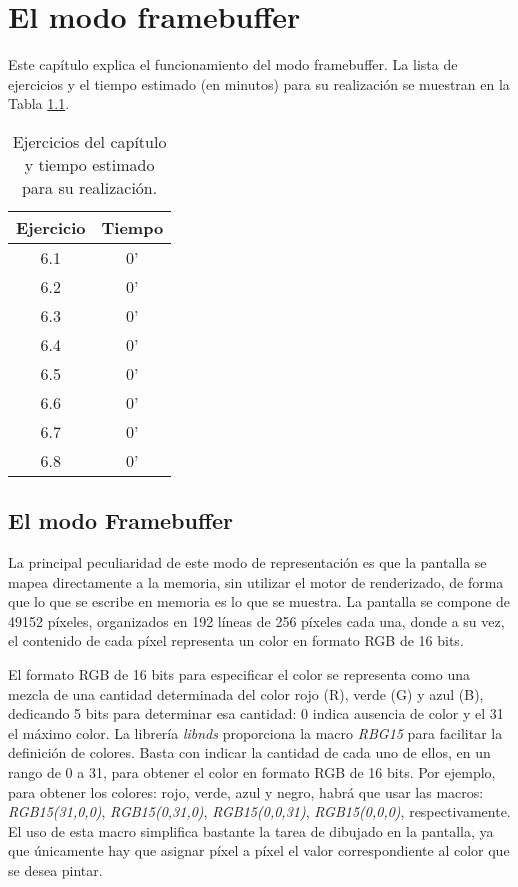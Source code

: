 \chapter{El modo framebuffer}

Este capítulo explica el funcionamiento del modo framebuffer. La lista de ejercicios y el tiempo estimado (en minutos) para su realización se muestran en la Tabla \ref{c6_tab:ejercios}.

\begin{table}[t]
	\centering
	\caption{Ejercicios del capítulo y tiempo estimado para su realización.}
	\begin{tabular}{|c|c|}
		\hline 
		Ejercicio & Tiempo \\ 
		\hline 
		6.1 & 0' \\ 
		6.2 & 0' \\ 
		6.3 & 0' \\ 
		6.4 & 0' \\ 
		6.5 & 0' \\ 
		6.6 & 0' \\ 
		6.7 & 0' \\ 
		6.8 & 0' \\ 
		\hline 
	\end{tabular} 
	\label{c6_tab:ejercios}
\end{table}

\section{El modo Framebuffer}
La principal peculiaridad de este modo de representación es que la pantalla se mapea directamente a la memoria, sin utilizar el motor de renderizado, de forma que lo que se escribe en memoria es lo que se muestra. La pantalla se compone de 49152 píxeles, organizados en 192 líneas de 256 píxeles cada una, donde a su vez, el contenido de cada píxel representa un color en formato RGB de 16 bits.

El formato RGB de 16 bits para especificar el color se representa como una mezcla de una cantidad determinada del color rojo (R), verde (G) y azul (B), dedicando 5 bits para determinar esa cantidad: 0 indica ausencia de color y el 31 el máximo color. La librería \textit{libnds} proporciona la macro \textit{RBG15} para facilitar la definición de colores. Basta con indicar la cantidad de cada uno de ellos, en un rango de 0 a 31, para obtener el color en formato RGB de 16 bits. Por ejemplo, para obtener los colores: rojo, verde, azul y negro, habrá que usar las macros: \textit{RGB15(31,0,0)}, \textit{RGB15(0,31,0)}, \textit{RGB15(0,0,31)}, \textit{RGB15(0,0,0)}, respectivamente. El uso de esta macro simplifica bastante la tarea de dibujado en la pantalla, ya que únicamente hay que asignar píxel a píxel el valor correspondiente al color que
se desea pintar.

